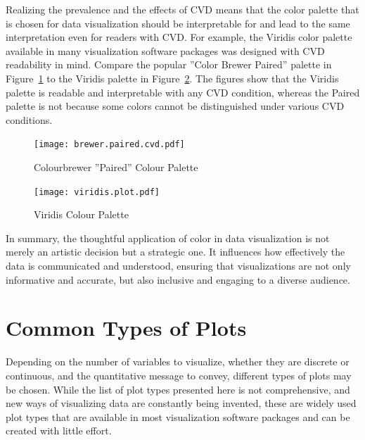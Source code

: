 Realizing the prevalence and the effects of CVD means that the color palette that is chosen for data visualization should be interpretable for and lead to the same interpretation even for readers with CVD. For example, the Viridis color palette available in many visualization software packages was designed with CVD readability in mind. Compare the popular ''Color Brewer Paired'' palette in Figure~\ref{fig:paired} to the Viridis palette in Figure~\ref{fig:viridis}. The figures show that the Viridis palette is readable and interpretable with any CVD condition, whereas the Paired palette is not because some colors cannot be distinguished under various CVD conditions.

\begin{figure}
\centering
  \texttt{[image: brewer.paired.cvd.pdf]}

\caption{Colourbrewer ''Paired'' Colour Palette}
\label{fig:paired}
\end{figure}

\begin{figure}
\centering
  \texttt{[image: viridis.plot.pdf]}

\caption{Viridis Colour Palette}
\label{fig:viridis}
\end{figure}

In summary, the thoughtful application of color in data visualization is not merely an artistic decision but a strategic one. It influences how effectively the data is communicated and understood, ensuring that visualizations are not only informative and accurate, but also inclusive and engaging to a diverse audience.

\FloatBarrier

\section{Common Types of Plots}

Depending on the number of variables to visualize, whether they are discrete or continuous, and the quantitative message to convey, different types of plots may be chosen. While the list of plot types presented here is not comprehensive, and new ways of visualizing data are constantly being invented, these are widely used plot types that are available in most visualization software packages and can be created with little effort.

